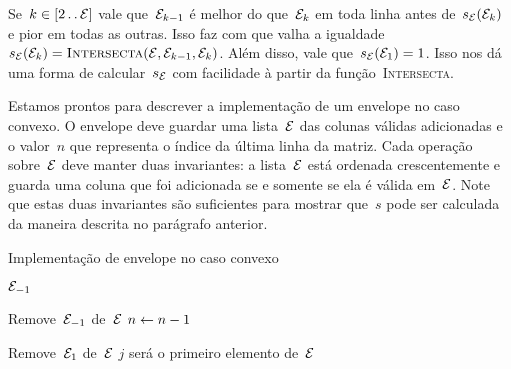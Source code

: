 Se~$k \in [2 \,.\,.\, \mathcal{E}]$ vale que~$\mathcal{E}_{k-1}$ é melhor do que~$\mathcal{E}_k$ em toda linha antes de~$s_{\mathcal{E}}(\mathcal{E}_k)$ e pior em todas as outras. Isso faz com que valha a igualdade~$s_{\mathcal{E}}(\mathcal{E}_k) = \textsc{Intersecta}(\mathcal{E},\mathcal{E}_{k-1},\mathcal{E}_k)$. Além disso, vale que~$s_{\mathcal{E}}(\mathcal{E}_1) = 1$. Isso nos dá uma forma de calcular~$s_{\mathcal{E}}$ com facilidade à partir da função~\textsc{Intersecta}.

Estamos prontos para descrever a implementação de um envelope no caso convexo. O envelope deve guardar uma lista~$\mathcal{E}$ das colunas válidas adicionadas e o valor~$n$ que representa o índice da última linha da matriz. Cada operação sobre~$\mathcal{E}$ deve manter duas invariantes: a lista~$\mathcal{E}$ está ordenada crescentemente e guarda uma coluna que foi adicionada se e somente se ela é válida em~$\mathcal{E}$. Note que estas duas invariantes são suficientes para mostrar que~$s$ pode ser calculada da maneira descrita no parágrafo anterior.

\begin{algorithm}[h]
\caption{Implementação de envelope no caso convexo}
\label{Online:Convexo:algo}
\begin{algorithmic}[1]
    \State \Return $\mathcal{E}_{-1}$
\EndFunction

     \label{Online:Convexo:algo:RemTira}
        \State Remove~$\mathcal{E}_{-1}$ de~$\mathcal{E}$
    \EndIf
    \State $n \leftarrow n-1$
\EndFunction

 
     
         
            \State Remove~$\mathcal{E}_{1}$ de~$\mathcal{E}$
        \EndWhile
        \State $j$ será o primeiro elemento de~$\mathcal{E}$
    \EndIf
\EndFunction
\end{algorithmic}
\end{algorithm}


